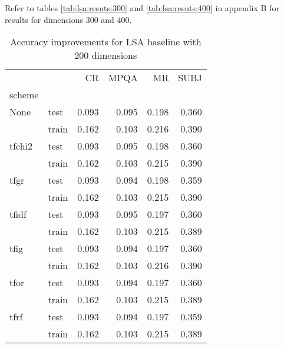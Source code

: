     Refer to tables \ref{tab:lsa:resuts:300} and \ref{tab:lsa:resuts:400} in appendix B for results for dimensions $300$ and $400$.
    
    \begin{table}[H]
    \begin{center}
    
    \begin{tabular}{llrrrr}
    \toprule
    {} &      &  CR &  MPQA &  MR &  SUBJ \\
    scheme &  &            &              &            &              \\
    \midrule
    None & test &      0.093 &        0.095 &      0.198 &        0.360 \\
    {} & train &      0.162 &        0.103 &      0.216 &        0.390 \\
    tfchi2 & test &      0.093 &        0.095 &      0.198 &        0.360 \\
    {} & train &      0.162 &        0.103 &      0.215 &        0.390 \\
    tfgr & test &      0.093 &        0.094 &      0.198 &        0.359 \\
    {} & train &      0.162 &        0.103 &      0.215 &        0.390 \\
    tfidf & test &      0.093 &        0.095 &      0.197 &        0.360 \\
    {} & train &      0.162 &        0.103 &      0.215 &        0.389 \\
    tfig & test &      0.093 &        0.094 &      0.197 &        0.360 \\
    {} & train &      0.162 &        0.103 &      0.216 &        0.390 \\
    tfor & test &      0.093 &        0.094 &      0.197 &        0.360 \\
    {} & train &      0.162 &        0.103 &      0.215 &        0.389 \\
    tfrf & test &      0.093 &        0.094 &      0.197 &        0.359 \\
    {} & train &      0.162 &        0.103 &      0.215 &        0.389 \\
    \bottomrule
    \end{tabular}
    
    \caption[Accuracy improvements for LSA baseline with 200 dimensions]{Accuracy improvements for LSA baseline with 200 dimensions}
    \label{tab:}
    \end{center}
    \end{table}

